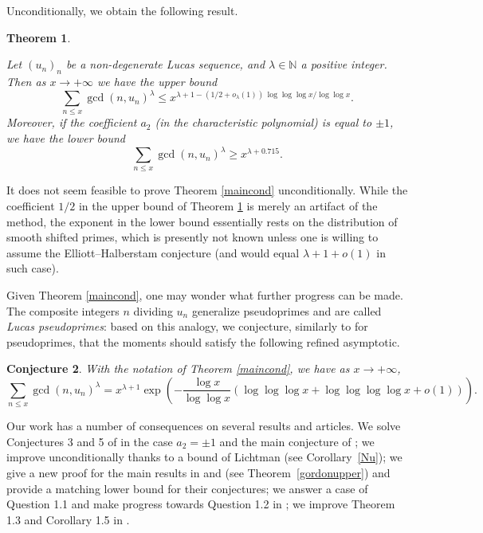 \documentclass[12pt,a4paper,oneside]{amsart}
\newtheorem{theorem}{Theorem}[section]
\newtheorem{conjecture}[theorem]{Conjecture}
\begin{document}
\medskip

Unconditionally, we obtain the following result.

\begin{theorem}\label{mainuncond}

Let $(u_n)_n$ be a non-degenerate Lucas sequence,  and $\lambda \in \mathbb N$ a positive integer. Then as $x \rightarrow +\infty$ we have the upper bound
 \begin{equation}\label{mainuncondeq}  \sum_{n \leq x} \gcd(n,u_n)^\lambda \leq x^{\lambda+1-(1/2+o_\lambda(1))\,\log\log\log x/\log\log x}. 
 \end{equation} Moreover, if the coefficient $a_2$ (in the characteristic polynomial) is equal to $\pm 1$, we  have the lower bound 
 \begin{equation}
     \sum_{n\le x}\gcd(n,u_n)^{\lambda}\ge x^{\lambda+0.715}.
 \end{equation}
\end{theorem}

It does not seem feasible to prove Theorem \ref{maincond} unconditionally. While the coefficient $1/2$ in the upper bound of Theorem \ref{mainuncond} is merely an artifact of the method, the exponent in the lower bound essentially rests on the distribution of smooth shifted primes, which is presently not known unless one is willing to assume the Elliott--Halberstam conjecture (and would equal $\lambda+1+o(1)$ in such case).

\medskip

Given Theorem \ref{maincond}, one may wonder what further progress can be made. The composite integers $n$ dividing $u_n$ generalize pseudoprimes and are called \emph{Lucas pseudoprimes}: based on this analogy, we conjecture, similarly to \cite[\S 4]{Po81} for pseudoprimes, that the moments should satisfy the following refined asymptotic.

\begin{conjecture}
With the notation of Theorem \ref{maincond}, we have as $x \rightarrow +\infty$,
\[ \sum_{n \leq x} \gcd(n,u_n)^\lambda = x^{\lambda+1} \exp \left( -\frac{\log x}{\log\log x} \left(\log\log\log x+\log\log\log\log x+o(1)\right) \right) .\]
\end{conjecture}

Our work has a number of consequences on several results and articles. We solve Conjectures 3 and 5 of \cite{Tr20} in the case $a_2=\pm 1$ and the main conjecture of \cite{LT15}; we improve \cite[Th. 1.3]{ALPS12} unconditionally thanks to a bound of Lichtman (see Corollary~\ref{Nu}); we give a new proof for the main results in \cite{LT15} and \cite{Sa17} (see Theorem~\ref{gordonupper}) and provide a matching lower bound for their conjectures; we answer a case of Question 1.1 and make progress towards Question 1.2 in \cite{ST18}; we improve Theorem 1.3 and Corollary 1.5 in \cite{Ma19}.
\end{document}

